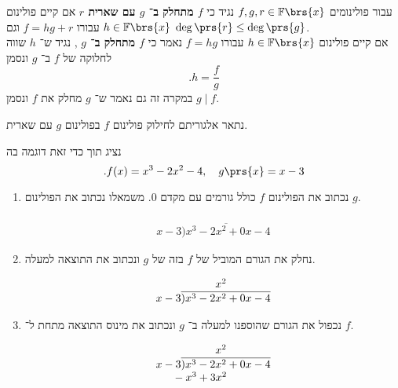 \documentclass[article, 10pt,oneside]{article}
\renewcommand{\emph}[1]{\textbf{#1}}
\begin{document}
\begin{definition}
עבור פולינומים
$f,g,r \in \mathbb{F}\brs{x}$
נגיד כי
\emph{
$f$
מתחלק ב־%
$g$
עם שארית
$r$
}
אם קיים פולינום
$h \in \mathbb{F}\brs{x}$
עבורו
$f = hg + r$
וגם
$\deg\prs{r} \leq \deg\prs{g}$.
\\
אם קיים פולינום
$h \in \mathbb{F}\brs{x}$
עבורו
$f = hg$
נאמר כי
\emph{
$f$
מתחלק ב־%
$g$
},
נגיד ש־%
$h$
שווה לחלוקה של
$f$
ב־%
$g$
ונסמן
\[\text{.} h = \frac{f}{g}\]
במקרה זה גם נאמר ש־%
$g$
מחלק את
$f$
ונסמן
$g \mid f$.
\end{definition}

\begin{algorithm}
נתאר אלגוריתם לחילוק פולינום
$f$
בפולינום
$g$
עם שארית.

נציג תוך כדי זאת דוגמה בה
\[\text{.} f(x) = x^3 - 2x^2 - 4, \quad g\prs{x} = x-3\]

\begin{enumerate}
\item נכתוב את הפולינום
$f$
כולל גורמים עם מקדם
$0$.
משמאלו נכתוב את הפולינום
$g$.

\begin{otherlanguage}{english}
\[
\begin{array}{l}
{}\\
x-3\overline{) x^3 - 2x^2 + 0x - 4}
\end{array}
\]
\end{otherlanguage}

\item

נחלק את הגורם המוביל של
$f$
בזה של
$g$
ונכתוב את התוצאה למעלה.

\begin{otherlanguage}{english}
\[
\begin{array}{l}
{\hphantom{x-3)x^3 - 2}}x^2\\
x-3\overline{) x^3 - 2x^2 + 0x - 4}
\end{array}
\]
\end{otherlanguage}


\item נכפול את הגורם שהוספנו למעלה ב־%
$g$
ונכתוב את מינוס התוצאה מתחת ל־%
$f$.

\begin{otherlanguage}{english}
\[
\begin{array}{l}
{\hphantom{x-3) x^3 - 2}}x^2\\
x-3\overline{) x^3 - 2x^2 + 0x - 4} \\
\hphantom{x-3} \hspace{-8pt} -x^3 + 3x^2
\end{array}
\]
\end{otherlanguage}


\end{enumerate}
\end{algorithm}
\end{document}

